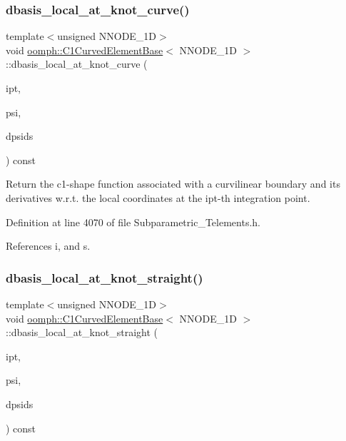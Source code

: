 \subsubsection{\texorpdfstring{dbasis\+\_\+local\+\_\+at\+\_\+knot\+\_\+curve()}{dbasis\_local\_at\_knot\_curve()}}
{\footnotesize\ttfamily template$<$unsigned N\+N\+O\+D\+E\+\_\+1D$>$ \\
void \hyperlink{classoomph_1_1C1CurvedElementBase}{oomph\+::\+C1\+Curved\+Element\+Base}$<$ N\+N\+O\+D\+E\+\_\+1D $>$\+::dbasis\+\_\+local\+\_\+at\+\_\+knot\+\_\+curve (\begin{DoxyParamCaption}\item[{const unsigned \&}]{ipt,  }\item[{\hyperlink{classoomph_1_1Shape}{Shape} \&}]{psi,  }\item[{\hyperlink{classoomph_1_1DShape}{D\+Shape} \&}]{dpsids }\end{DoxyParamCaption}) const\hspace{0.3cm}{\ttfamily [inline]}}

Return the c1-\/shape function associated with a curvilinear boundary and its derivatives w.\+r.\+t. the local coordinates at the ipt-\/th integration point. 

Definition at line 4070 of file Subparametric\+\_\+\+Telements.\+h.



References i, and s.

\mbox{\label{classoomph_1_1C1CurvedElementBase_a74fedb14f6c859fdc0d0c37d77f63963}} 
\subsubsection{\texorpdfstring{dbasis\+\_\+local\+\_\+at\+\_\+knot\+\_\+straight()}{dbasis\_local\_at\_knot\_straight()}}
{\footnotesize\ttfamily template$<$unsigned N\+N\+O\+D\+E\+\_\+1D$>$ \\
void \hyperlink{classoomph_1_1C1CurvedElementBase}{oomph\+::\+C1\+Curved\+Element\+Base}$<$ N\+N\+O\+D\+E\+\_\+1D $>$\+::dbasis\+\_\+local\+\_\+at\+\_\+knot\+\_\+straight (\begin{DoxyParamCaption}\item[{const unsigned \&}]{ipt,  }\item[{\hyperlink{classoomph_1_1Shape}{Shape} \&}]{psi,  }\item[{\hyperlink{classoomph_1_1DShape}{D\+Shape} \&}]{dpsids }\end{DoxyParamCaption}) const\hspace{0.3cm}{\ttfamily [inline]}}



